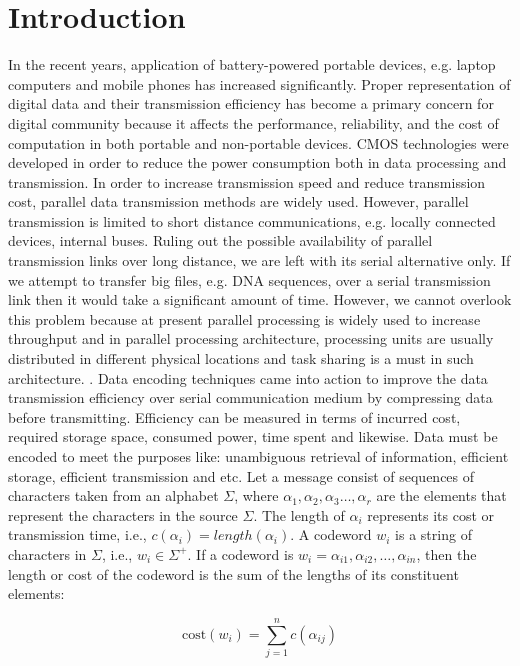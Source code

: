 \documentclass[preprint,12pt]{elsarticle}
\begin{document}

\section{Introduction}
\label{sec1}
In the recent years, application of battery-powered portable devices, e.g. laptop computers and mobile phones has increased significantly. Proper representation of digital data and their transmission efficiency has become a primary concern for digital community because it affects the performance, reliability, and the cost of computation in both portable and non-portable devices. CMOS technologies were developed in order to reduce the power consumption both in data processing and transmission. In order to increase transmission speed and reduce transmission cost, parallel data transmission methods are widely used. However, parallel transmission is limited to short distance communications, e.g. locally connected devices, internal buses. Ruling out the possible availability of parallel transmission links over long distance, we are left with its serial alternative only. If we attempt to transfer big files, e.g. DNA sequences, over a serial transmission link then it would take a significant amount of time. However, we cannot overlook this problem because at present parallel processing is widely used to increase throughput and in parallel processing architecture, processing units are usually distributed in different physical locations and task sharing is a must in such architecture.    
.
Data encoding techniques came into action to improve the data transmission efficiency over serial communication medium by compressing data before transmitting. Efficiency can be measured in terms of incurred cost, required storage space, consumed power, time spent and likewise. Data must be encoded to meet the purposes like: unambiguous retrieval of information, efficient storage, efficient transmission and etc. Let a message consist of sequences of characters taken from an alphabet $\Sigma$, where  $\alpha_1,\alpha_2,\alpha_3\ldots,\alpha_r$ are the elements that represent the characters in the source $\Sigma$. The length of $\alpha_i$ represents its cost or transmission time, i.e., $c\left(\alpha_i\right)= length(\alpha_i)$. A codeword $w_i$ is a string of characters in $\Sigma$, i.e., $w_i\in\Sigma^{+}$. If a codeword is $w_i=\alpha_{i1},\alpha_{i2},\ldots,\alpha_{in}$, then the length or cost of the codeword is the sum of the lengths of its constituent elements:

\begin{equation}
\label{eqn1}
  \text{cost}\left(w_i\right)=\sum_{j=1}^{n}c\left(\alpha_{ij}\right)
\end{equation} 
  
\end{document}
